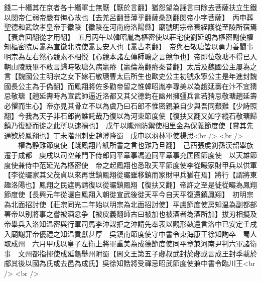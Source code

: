 錢二十緡其在京者各十緡軍士無厭【厭於言翻】猶怨望為謡言曰除去菩薩扶立生鐵以閔帝仁弱帝嚴有悔心故也【去羌呂翻菩薄乎翻薩桑割翻閔帝小字菩薩】　丙申葬聖德和武欽孝皇帝于徽陵【徽陵在河南府洛陽縣】廟號明宗帝衰絰護從至陵所宿焉【衰倉回翻從才用翻】　五月丙午以韓昭胤為樞密使以莊宅使劉延朗為樞密副使權知樞密院房暠為宣徽北院使暠長安人也【暠古老翻】　帝與石敬瑭皆以勇力善闘事明宗為左右然心競素不相悦【心競本諸左傳師曠之言競争也】帝即位敬瑭不得已入朝山陵既畢不敢言歸時敬瑭久病羸瘠【羸倫為翻瘠秦昔翻】太后及魏國公主屢為之言【魏國公主明宗之女下嫁石敬瑭曹太后所生也歐史公主初號永寧公主是年進封魏國長公主為于偽翻】而鳳翔將佐多勸帝留之惟韓昭胤李專美以為趙延壽在汴不宜猜忌敬瑭【趙延夀時為宣武帥逼近洛都又其父德鈞在幽州擁彊兵言若猜忌敬瑭趙延壽必懼而生心】帝亦見其骨立不以為虞乃曰石郎不惟密親兼自少與吾同艱難【少詩照翻】今我為天子非石郎尚誰託哉乃復以為河東節度使【復扶又翻又如字縱石敬瑭歸鎮乃復疑而徙之此所以速禍也】　戊午以隴州防禦使相里金為保義節度使【賞其先通欵於鳳翔也】丁未階州刺史趙澄降蜀　戊申以羽林軍使楊思<br />
<br />
　　權為静難節度使【踐鳳翔片紙所書之言也難乃旦翻】　己酉張䖍釗孫漢韶舉族遷于成都　庚戌以司空兼門下侍郎同平章事馮道同平章事充匡國節度使　以天雄節度使兼侍中范延光為樞密使　帝之起鳳翔也悉取天平節度使李從曮家財甲兵以供軍【李從曮家其父茂貞以來再世鎮鳳翔從曮雖移鎮而家財甲兵猶在焉】將行【謂將東趣洛陽也】鳳翔之民遮馬請復以從曮鎮鳳翔【復扶又翻】帝許之至是徙從曮為鳳翔節度使【長興元年從曮自鳳翔入朝徙宣武後徙天平今自天平復還鎮鳳翔】　初明宗為北面招討使【莊宗同光二年始以明宗為北面招討使】平盧節度使房知温為副都部署帝以别將事之嘗被酒忿争【被皮義翻師古曰被加也被酒者為酒所加】拔刃相擬及帝舉兵入洛知温密與行軍司馬李沖謀拒之沖請先奉表以觀形埶還言洛中已安定壬戌入廟謝罪帝優禮之知温貢獻甚厚　吳鎮南節度使守中書令東海康王徐知詢卒　蜀人取成州　六月甲戌以皇子左衛上將軍重美為成德節度使同平章兼河南尹判六軍諸衛事　文州都指揮使成延龜舉州附蜀【周文王第五子郕叔武封於郕或言成王封季載於郕其後以國為氏或去邑為成氏】吳徐知誥將受禪忌昭武節度使兼中書令臨川王<br />
<br />
